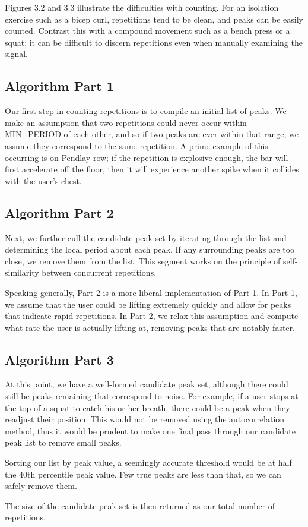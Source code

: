 Figures 3.2 and 3.3 illustrate the difficulties with counting. For an isolation exercise such as a bicep curl, repetitions tend to be clean, and peaks can be easily counted. Contrast this with a compound movement such as a bench press or a squat; it can be difficult to discern repetitions even when manually examining the signal.

\subsection{Algorithm Part 1}
Our first step in counting repetitions is to compile an initial list of peaks. We make an assumption that two repetitions could never occur within MIN\_PERIOD of each other, and so if two peaks are ever within that range, we assume they correspond to the same repetition. A prime example of this occurring is on Pendlay row; if the repetition is explosive enough, the bar will first accelerate off the floor, then it will experience another spike when it collides with the user's chest. 

\subsection{Algorithm Part 2}
Next, we further cull the candidate peak set by iterating through the list and determining the local period about each peak. If any surrounding peaks are too close, we remove them from the list. This segment works on the principle of self-similarity between concurrent repetitions. 

Speaking generally, Part 2 is a more liberal implementation of Part 1. In Part 1, we assume that the user could be lifting extremely quickly and allow for peaks that indicate rapid repetitions. In Part 2, we relax this assumption and compute what rate the user is actually lifting at, removing peaks that are notably faster. 

\subsection{Algorithm Part 3}
At this point, we have a well-formed candidate peak set, although there could still be peaks remaining that correspond to noise. For example, if a user stops at the top of a squat to catch his or her breath, there could be a peak when they readjust their position. This would not be removed using the autocorrelation method, thus it would be prudent to make one final pass through our candidate peak list to remove small peaks. 

Sorting our list by peak value, a seemingly accurate threshold would be at half the 40th percentile peak value. Few true peaks are less than that, so we can safely remove them. 

The size of the candidate peak set is then returned as our total number of repetitions.
